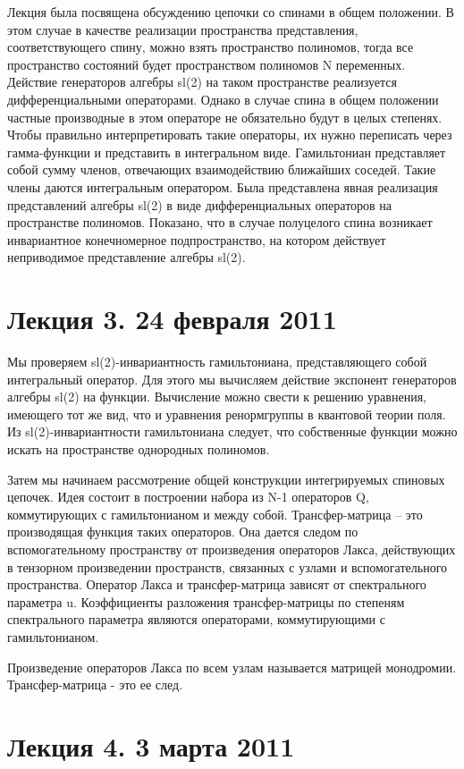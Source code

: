 \documentclass[a4paper,12pt]{article}
\theoremstyle{definition} \newtheorem{Def}{Definition}
\theoremstyle{definition}
\begin{document}
Лекция была посвящена обсуждению цепочки со спинами в общем положении. В этом случае в качестве реализации пространства представления, соответствующего спину, можно взять пространство полиномов, тогда все пространство состояний будет пространством полиномов N переменных. Действие генераторов алгебры sl(2) на таком пространстве реализуется дифференциальными операторами. Однако в случае спина в общем положении частные производные в этом операторе не обязательно будут в целых степенях. Чтобы правильно интерпретировать такие операторы, их нужно переписать через гамма-функции и представить в интегральном виде.
Гамильтониан представляет собой сумму членов, отвечающих взаимодействию ближайших соседей. Такие члены даются интегральным оператором.  Была представлена явная реализация представлений алгебры sl(2) в виде дифференциальных операторов на пространстве полиномов. Показано, что в случае полуцелого спина возникает инвариантное конечномерное подпространство, на котором действует неприводимое представление алгебры sl(2).

\section{Лекция 3. 24 февраля 2011}

Мы проверяем sl(2)-инвариантность гамильтониана, представляющего собой интегральный оператор. Для этого мы вычисляем действие экспонент генераторов алгебры sl(2) на функции. Вычисление можно свести к решению уравнения, имеющего тот же вид, что и уравнения ренормгруппы в квантовой теории поля. Из sl(2)-инвариантности гамильтониана следует, что собственные функции можно искать на пространстве однородных полиномов.

Затем мы начинаем рассмотрение общей конструкции интегрируемых спиновых цепочек. Идея состоит в построении набора из N-1 операторов Q, коммутирующих с гамильтонианом и между собой. Трансфер-матрица -- это производящая функция таких операторов. Она дается следом по вспомогательному пространству от произведения операторов Лакса, действующих в тензорном произведении пространств, связанных с узлами и вспомогательного пространства. Оператор Лакса и трансфер-матрица зависят от спектрального параметра u. Коэффициенты разложения трансфер-матрицы по степеням спектрального параметра являются операторами, коммутирующими с гамильтонианом.

Произведение операторов Лакса по всем узлам называется матрицей монодромии. Трансфер-матрица - это ее след.

\section{Лекция 4. 3 марта 2011}
\end{document}
